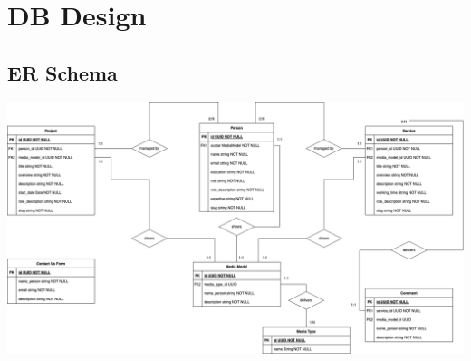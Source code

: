 \pagebreak
\section{DB Design}
\subsection{ER Schema}
\includegraphics[width=1\linewidth]{img/design-document/ER-diagram.png}
